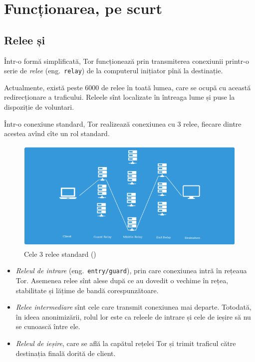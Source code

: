 
\chapter{Funcționarea, pe scurt}

\section{Relee și }
\indent\indent Într-o formă simplificată, Tor funcționează prin transmiterea conexiunii 
printr-o serie de \emph{relee} (eng.\ \texttt{relay}) de la computerul inițiator pînă la
destinație.

Actualmente, există peste 6000 de relee în toată lumea, care se ocupă cu această
redirecționare a traficului. Releele sînt localizate în întreaga lume și puse la
dispoziție de voluntari.

Într-o conexiune standard, Tor realizează conexiunea cu 3 relee, fiecare dintre
acestea avînd cîte un rol standard.
\begin{figure}[!htbp]
  \centering
  \includegraphics[scale=0.5]{fig/3relays.png}
  \caption{Cele 3 relee standard (\cite{jw1})}
  \label{fig:3rel}
\end{figure}

\begin{itemize}
  \item \textit{Releul de intrare} (eng.\ \texttt{entry/guard}), prin care conexiunea
    intră în rețeaua Tor. Asemenea relee sînt alese după ce au dovedit o vechime
    în rețea, stabilitate și lățime de bandă corespunzătoare.
  \item \emph{Relee intermediare} sînt cele care transmit conexiunea mai departe.
    Totodată, în ideea anonimizării, rolul lor este ca releele de intrare și cele
    de ieșire să nu se cunoască între ele.
  \item \emph{Releul de ieșire}, care se află la capătul rețelei Tor și trimit 
    traficul către destinația finală dorită de client.
\end{itemize}

